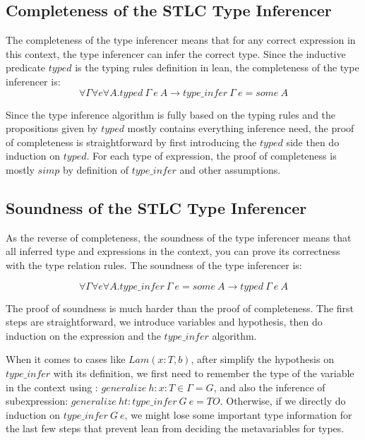 \documentclass[conference]{IEEEtran}
\begin{document}
\subsection{Completeness of the STLC Type Inferencer}
The completeness of the type inferencer means that for any correct expression
in this context, the type inferencer can infer the correct type. Since
the inductive predicate $typed$ is the typing rules definition in lean,
the completeness of the type inferencer is:
\begin{equation}
	\forall \Gamma\forall e\forall A.typed\ \Gamma\ e\ A \to type\_infer\ \Gamma \ e = some\ A
	\label{eq:cmp}
\end{equation}

Since the type inference algorithm is fully based on the typing rules and
the propositions given by $typed$ mostly contains everything inference need,
the proof of completeness is straightforward by first introducing the $typed$
side then do induction on $typed$. For each type of expression, the proof
of completeness is mostly $simp$ by definition of $type\_infer$ and other
assumptions.

\subsection{Soundness of the STLC Type Inferencer}
As the reverse of completeness,
the soundness of the type inferencer means that all inferred type and
expressions in the context, you can prove its correctness with the type
relation rules. The soundness of the type inferencer is:

\begin{equation}
	\forall \Gamma\forall e\forall A. type\_infer\ \Gamma \ e = some\ A \to typed\ \Gamma\ e\ A
	\label{eq:snd}
\end{equation}

The proof of soundness is much harder than the proof of completeness.
The first steps are straightforward, we introduce variables and hypothesis,
then do induction on the expression and the $type\_infer$ algorithm.

When it comes to cases like $Lam(x:T, b)$, after simplify the hypothesis on
$type\_infer$ with its definition, we first need to remember the type of
the variable in the context using : $generalize\ h:x:T\in\Gamma=G$,
and also the inference of subexpression: $generalize\ ht:type\_infer\ G\ e=TO$.
\cite{pierce2010software}
Otherwise, if we directly do induction on $type\_infer\ G\ e$, we might lose
some important type information for the last few steps that prevent lean from
deciding the metavariables for types.
\end{document}
